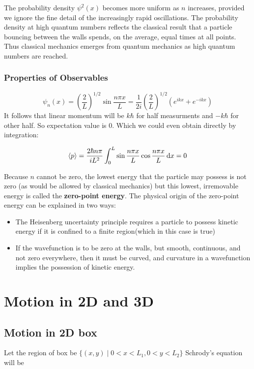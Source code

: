 \documentclass[11pt]{article}
\theoremstyle{definition}
\begin{document}
The probability density $\psi^2(x)$ becomes more uniform as $n$ increases, provided we ignore the fine detail of the increasingly rapid oscillations. The probability density at high quantum numbers reflects the classical result that a particle bouncing between the walls spends, on the average, equal times at all points. Thus classical mechanics emerges from quantum mechanics as high quantum numbers are reached.
\subsubsection{Properties of Observables}

$$\psi_n(x) = \left(\frac{2}{L}\right)^{1/2}\sin{\frac{n\pi x}{L}} = \frac{1}{2i}\left(\frac{2}{L}\right)^{1/2} (e^{ikx} + e^{-ikx})$$
It follows that linear momentum will be $k\hbar$ for half measurments and $-k\hbar$ for other half. So expectation value is 0. Which we could even obtain directly by integration:

\begin{equation*}
    \expval{p} =  \frac{2\hbar n \pi}{iL^2} \int_0 ^L \sin{\frac{n\pi x}{L}} \cos{\frac{n \pi x}{L}} \dd{x} = 0
\end{equation*}

Because $n$ cannot be zero, the lowest energy that the particle may possess is not zero (as would be allowed by classical mechanics) but this lowest, irremovable energy is called the \textbf{zero-point energy}. The physical origin of the zero-point energy can be explained in two ways:

\begin{itemize}
    \item The Heisenberg uncertainty principle requires a particle to possess kinetic energy if it is confined to a finite region(which in this case is true)
    \item If the wavefunction is to be zero at the walls, but smooth, continuous, and not zero everywhere, then it must be curved, and curvature in a wavefunction implies the possession of kinetic energy.
\end{itemize}
\section{Motion in 2D and 3D}
\subsection{Motion in 2D box}
Let the region of box be $\{(x,y) \mid 0<x<L_1, 0<y<L_2 \}$
Schrody's equation will be 
\end{document}
